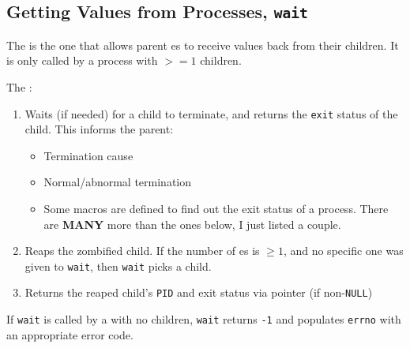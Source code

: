\subsection{Getting Values from Processes, \texttt{wait}}\label{subsec:Values_from_Processes-wait}
The   is the one that allows parent es to receive values back from their children.
It is only called by a process with $>= 1$ children.

The  :
\begin{enumerate}[noitemsep]
\item Waits (if needed) for a child to terminate, and returns the \texttt{exit} status of the child.
  This informs the parent:
  \begin{itemize}[noitemsep]
  \item Termination cause
  \item Normal/abnormal termination
  \item Some macros are defined to find out the exit status of a process.
    There are \textbf{MANY} more than the ones below, I just listed a couple.
  \end{itemize}

\item Reaps the zombified child.
  If the number of es is $\geq 1$, and no specific one was given to \texttt{wait}, then \texttt{wait} picks a child.
\item Returns the reaped child's \texttt{PID} and exit status via pointer (if non-\texttt{NULL})
\end{enumerate}

If \texttt{wait} is called by a  with no children, \texttt{wait} returns \texttt{-1} and populates \texttt{errno} with an appropriate error code.


